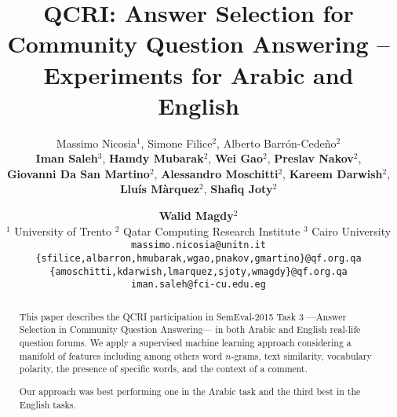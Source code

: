 \documentclass[11pt,letterpaper]{article}
\title{%
QCRI: Answer Selection for Community Question Answering -- \\ Experiments for 
Arabic and English
}
\author{%
Massimo Nicosia$^1$, Simone Filice$^2$, Alberto Barr\'on-Cede\~no$^2$  \\
{\bf Iman Saleh}$^3$, {\bf Hamdy Mubarak}$^2$, {\bf Wei Gao$^2$}, 
{\bf Preslav Nakov$^2$}, \\
{\bf Giovanni Da San Martino$^2$}, {\bf Alessandro Moschitti}$^2$,
{\bf Kareem Darwish$^2$}, \\ 
{\bf Llu\'is M\`arquez$^2$}, {\bf Shafiq Joty$^2$} \and {\bf Walid Magdy$^2$} 
\\
$^1$ University of Trento \hspace{1em}
$^2$ Qatar Computing Research Institute	\hspace{1em}
$^3$ Cairo University \\
\small
{\tt massimo.nicosia@unitn.it}	\\
\small
{\tt \{sfilice,albarron,hmubarak,wgao,pnakov,gmartino\}@qf.org.qa} 	\\
\small
{\tt \{amoschitti,kdarwish,lmarquez,sjoty,wmagdy\}@qf.org.qa}	\\
\small
{\tt iman.saleh@fci-cu.edu.eg}
% 
% 
% 
% 
% 
}
\date{}
\begin{document}
\maketitle
\begin{abstract}
This paper describes the QCRI participation in SemEval-2015 Task 3 ---Answer 
Selection in Community Question Answering--- in both Arabic and English 
real-life question forums. We apply a supervised machine learning approach 
considering a manifold of features including among others word $n$-grams, text 
similarity, vocabulary polarity, the presence of specific words, and the context 
of a comment.

Our approach was best performing one in the Arabic task and the third 
best in the English tasks.
\end{abstract}


% 














% 
% 
% 
% 

\end{document}
